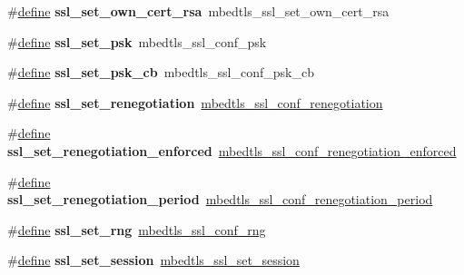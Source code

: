 \begin{DoxyCompactItemize}
\#\hyperlink{structdefine}{define} {\bfseries ssl\+\_\+set\+\_\+own\+\_\+cert\+\_\+rsa}~mbedtls\+\_\+ssl\+\_\+set\+\_\+own\+\_\+cert\+\_\+rsa
\item 
\mbox{\label{compat-1_83_8h_ada7daeb6114a4941e4b694168da9b328}} 
\#\hyperlink{structdefine}{define} {\bfseries ssl\+\_\+set\+\_\+psk}~mbedtls\+\_\+ssl\+\_\+conf\+\_\+psk
\item 
\mbox{\label{compat-1_83_8h_a83027e256a317ea96d65d57bd19d2546}} 
\#\hyperlink{structdefine}{define} {\bfseries ssl\+\_\+set\+\_\+psk\+\_\+cb}~mbedtls\+\_\+ssl\+\_\+conf\+\_\+psk\+\_\+cb
\item 
\mbox{\label{compat-1_83_8h_a309f8b3a84ffb6833db1727b0a33f6f2}} 
\#\hyperlink{structdefine}{define} {\bfseries ssl\+\_\+set\+\_\+renegotiation}~\hyperlink{ssl_8h_aad4f50fc1c0a018fd5eb18fd9621d0d3}{mbedtls\+\_\+ssl\+\_\+conf\+\_\+renegotiation}
\item 
\mbox{\label{compat-1_83_8h_ad4715bb2675c7dbd734b4ec24190f867}} 
\#\hyperlink{structdefine}{define} {\bfseries ssl\+\_\+set\+\_\+renegotiation\+\_\+enforced}~\hyperlink{ssl_8h_a2d193b15941a556baaf2cb94138d66df}{mbedtls\+\_\+ssl\+\_\+conf\+\_\+renegotiation\+\_\+enforced}
\item 
\mbox{\label{compat-1_83_8h_adad47941365922046dc56d667c016c81}} 
\#\hyperlink{structdefine}{define} {\bfseries ssl\+\_\+set\+\_\+renegotiation\+\_\+period}~\hyperlink{ssl_8h_a1785faa0640bd6190c1c17a94b408e31}{mbedtls\+\_\+ssl\+\_\+conf\+\_\+renegotiation\+\_\+period}
\item 
\mbox{\label{compat-1_83_8h_aa9402497debe860c3395aa1f6f5f4db6}} 
\#\hyperlink{structdefine}{define} {\bfseries ssl\+\_\+set\+\_\+rng}~\hyperlink{ssl_8h_a469cd1c64bbba4be22347bf8874a017e}{mbedtls\+\_\+ssl\+\_\+conf\+\_\+rng}
\item 
\mbox{\label{compat-1_83_8h_ae1f82675d05d7d9b64ef8bca453ded77}} 
\#\hyperlink{structdefine}{define} {\bfseries ssl\+\_\+set\+\_\+session}~\hyperlink{ssl_8h_a91be5c606b9f7c1e44b3e507a4fe7b66}{mbedtls\+\_\+ssl\+\_\+set\+\_\+session}
\item 
\mbox{\label{compat-1_83_8h_aa3a4fa83a3bcb6caa78a4ecadad59932}} 

\end{DoxyCompactItemize}
